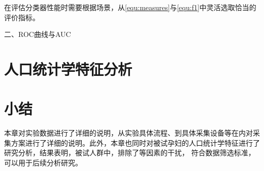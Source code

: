 在评估分类器性能时需要根据场景，从\autoref{equ:measures}与\autoref{equ:f1}中灵活选取恰当的评价指标。

二、ROC曲线与AUC


\section{人口统计学特征分析}

\section{小结}
本章对实验数据进行了详细的说明，从实验具体流程、到具体采集设备等在内对采集方案进行了详细的说明。此外，本章也同时对被试孕妇的人口统计学特征进行了研究分析，结果表明，被试人群中，排除了等因素的干扰，
符合数据筛选标准，可以用于后续分析研究。  